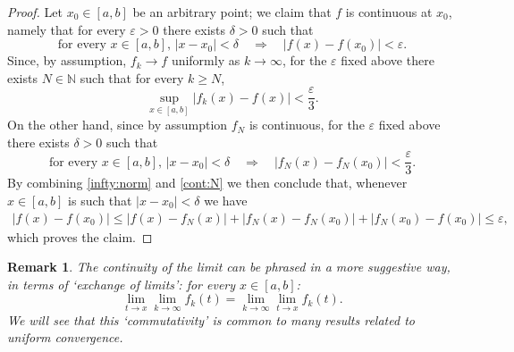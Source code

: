 \documentclass[a4paper,reqno]{amsart}
\numberwithin{equation}{section}
\newtheorem{theorem}[definition]{Theorem}
\newtheorem{remark}[definition]{Remark}
\def\N{\mathbb{N}}
\def\R{\mathbb{R}}
\begin{document}
\begin{proof}
Let $x_0\in [a,b]$ be an arbitrary point; we claim that $f$ is continuous at $x_0$, namely that for every $\varepsilon>0$ there exists $\delta>0$ such that
$$
\text{for every } x\in [a,b], \, |x-x_0| < \delta \quad \Rightarrow \quad |f(x)-f(x_0)|<\varepsilon.
$$
Since, by assumption, $f_k\to f$ uniformly as $k \to \infty$, for the $\varepsilon$ fixed above there exists $N\in \N$ such that for every $k\geq N$,
\begin{equation}\label{infty:norm}
\sup_{x\in [a,b]} |f_k(x)-f(x)| < \frac{\varepsilon}3.
\end{equation}
On the other hand, since by assumption $f_N$ is continuous, for the $\varepsilon$ fixed above there exists $\delta>0$ such that
\begin{equation}\label{cont:N}
\text{for every } x\in [a,b], \, |x-x_0| < \delta \quad \Rightarrow \quad |f_N(x)-f_N(x_0)|<\frac{\varepsilon}3.
\end{equation}
By combining \eqref{infty:norm} and \eqref{cont:N} we then conclude that, whenever $x\in [a,b]$ is such that $|x-x_0| < \delta$ we have
\begin{align*}
 |f(x)-f(x_0)| \leq  |f(x)-f_N(x)| +  |f_N(x)-f_N(x_0)| +  |f_N(x_0)-f(x_0)| \leq \varepsilon,
\end{align*}
which proves the claim.
\end{proof}

\begin{remark}
The continuity of the limit can be phrased in a more suggestive way, in terms of `exchange of limits': for every $x\in [a,b]$:
$$
\lim_{t\to x} \lim_{k\to \infty} f_k(t) = \lim_{k\to \infty}\lim_{t\to x} f_k(t).
$$
We will see that this `commutativity' is common to many results related to uniform convergence.
\end{remark}

%
%
%
\end{document}
